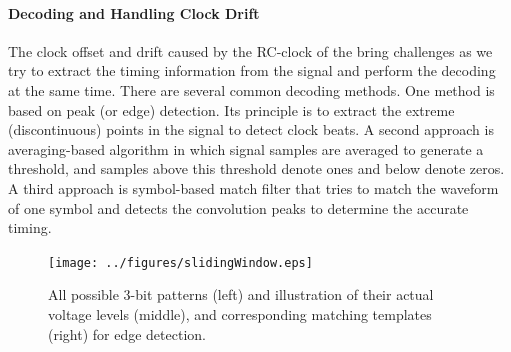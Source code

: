 \paragraph{Decoding and Handling Clock Drift}
The clock offset and drift caused by the RC-clock of the \vitag bring challenges as we try to extract the timing information from the signal and perform the decoding at the same time. %
There are several common decoding methods. One method is based on peak (or edge) detection. Its principle is to extract the extreme (discontinuous) points in the signal to detect clock beats. A second approach is averaging-based algorithm in which signal samples are averaged to generate a threshold, and samples above this threshold denote ones and below denote zeros. A third approach is symbol-based match filter that tries to match the waveform of one symbol and detects the convolution peaks to determine the accurate timing.

\begin{figure}[tb!]
\centering
\texttt{[image: ../figures/slidingWindow.eps]}
\vskip -0.05in
\caption{All possible 3-bit patterns (left) and illustration of their actual voltage levels (middle), and corresponding matching templates (right) for edge detection. 
}
\label{fig:swmsmf}
\end{figure}


